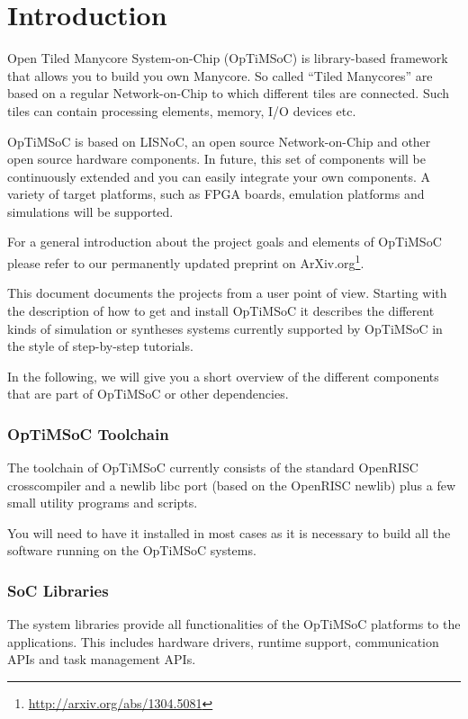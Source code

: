 \chapter{Introduction}
\label{chap:introduction}

Open Tiled Manycore System-on-Chip (OpTiMSoC) is library-based
framework that allows you to build you own Manycore. So called ``Tiled
Manycores'' are based on a regular Network-on-Chip to which different
tiles are connected. Such tiles can contain processing elements,
memory, I/O devices etc.

OpTiMSoC is based on LISNoC, an open source Network-on-Chip and other
open source hardware components. In future, this set of components
will be continuously extended and you can easily integrate your own
components. A variety of target platforms, such as FPGA boards,
emulation platforms and simulations will be supported.

For a general introduction about the project goals and elements of
OpTiMSoC please refer to our permanently updated preprint on
ArXiv.org\footnote{\url{http://arxiv.org/abs/1304.5081}}.

\medskip

This document documents the projects from a user point of view.
Starting with the description of how to get and install OpTiMSoC it
describes the different kinds of simulation or syntheses systems
currently supported by OpTiMSoC in the style of step-by-step
tutorials.

In the following, we will give you a short overview of the different
components that are part of OpTiMSoC or other dependencies.

\subsection*{OpTiMSoC Toolchain}

The toolchain of OpTiMSoC currently consists of the standard OpenRISC
crosscompiler and a newlib libc port (based on the OpenRISC newlib)
plus a few small utility programs and scripts.

You will need to have it installed in most cases as it is necessary to
build all the software running on the OpTiMSoC systems.

\subsection*{SoC Libraries}

The system libraries provide all functionalities of the OpTiMSoC
platforms to the applications. This includes hardware drivers, runtime
support, communication APIs and task management APIs.

